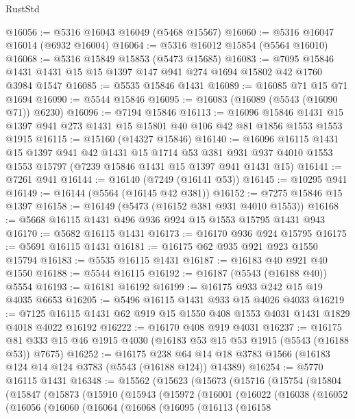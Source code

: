 \begin{lexlean}{RustStd}
\begin{coremodule}
@16056 := @5316 @16043 @16049 (@5468 @15567)
@16060 := @5316 @16047 @16014 (@6932 @16004)
@16064 := @5316 @16012 @15854 (@5564 @16010)
@16068 := @5316 @15849 @15853 (@5473 @15685)
@16083 := @7095 @15846 @1431 @1431 @15 @15 @1397 @147 @941 @274 @1694 @15802 @42 @1760 @3984 @1547
@16085 := @5535 @15846 @1431
@16089 := @16085 @71 @15 @71 @1694
@16090 := @5544 @15846
@16095 := @16083 (@16089 (@5543 (@16090 @71)) @6230)
@16096 := @7194 @15846
@16113 := @16096
    @15846
    @1431
    @15
    @1397
    @941
    @273
    @1431
    @15
    @15801
    @40
    @106
    @42
    @81
    @1856
    @1553
    @1553
    @1915
@16115 := @15160 (@14327 @15846)
@16140 := @16096
    @16115
    @1431
    @15
    @1397
    @941
    @42
    @1431
    @15
    @1714
    @53
    @381
    @931
    @937
    @4010
    @1553
    @1553
    @15797
    (@7239 @15846 @1431 @15 @1397 @941 @1431 @15)
@16141 := @7261 @941
@16144 := @16140 (@7249 (@16141 @53))
@16145 := @10295 @941
@16149 := @16144 (@5564 (@16145 @42 @381))
@16152 := @7275 @15846 @15 @1397
@16158 := @16149 (@5473 (@16152 @381 @931 @4010 @1553))
@16168 := @5668 @16115 @1431 @496 @936 @924 @15 @1553 @15795 @1431 @943
@16170 := @5682 @16115 @1431
@16173 := @16170 @936 @924 @15795
@16175 := @5691 @16115 @1431
@16181 := @16175 @62 @935 @921 @923 @1550 @15794
@16183 := @5535 @16115 @1431
@16187 := @16183 @40 @921 @40 @1550
@16188 := @5544 @16115
@16192 := @16187 (@5543 (@16188 @40)) @5554
@16193 := @16181 @16192
@16199 := @16175 @933 @242 @15 @19 @4035 @6653
@16205 := @5496 @16115 @1431 @933 @15 @4026 @4033
@16219 := @7125 @16115 @1431 @62 @919 @15 @1550 @408 @1553 @4031 @1431 @1829 @4018 @4022 @16192
@16222 := @16170 @408 @919 @4031
@16237 := @16175 @81 @333 @15 @46 @1915 @4030 (@16183 @53 @15 @53 @1915 (@5543 (@16188 @53)) @7675)
@16252 := @16175
    @238
    @64
    @14
    @18
    @3783
    @1566
    (@16183 @124 @14 @124 @3783 (@5543 (@16188 @124)) @14389)
@16254 := @5770 @16115 @1431
@16348 := @15562
    (@15623
      (@15673
        (@15716
          (@15754
            (@15804
              (@15847
                (@15873
                  (@15910
                    (@15943
                      (@15972
                        (@16001
                          (@16022
                            (@16038
                              (@16052
                                (@16056
                                  (@16060
                                    (@16064
                                      (@16068
                                        (@16095
                                          (@16113
                                            (@16158

\end{coremodule}
\end{lexlean}
